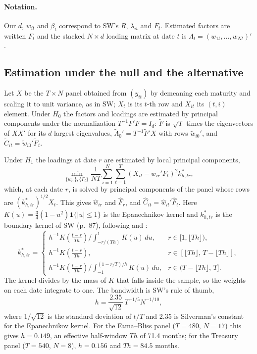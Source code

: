 \documentclass[11pt]{article}
\begin{document}
\paragraph{Notation.} Our $d$, $w_{it}$ and $\beta_t$ correspond to SW's $R$, $\lambda_{it}$ and $F_t$. Estimated factors are written $F_t$ and the stacked $N\times d$ loading matrix at date $t$ is $\Lambda_t=(w_{1t},\ldots,w_{Nt})'$.

\subsection{Estimation under the null and the alternative}

Let $X$ be the $T\times N$ panel obtained from $(y_{it})$ by demeaning each maturity and scaling it to unit variance, as in SW; $X_t$ is its $t$-th row and $X_{it}$ its $(t,i)$ element. Under $H_0$ the factors and loadings are estimated by principal components \citep{BaiNg2002,Bai2003} under the normalization $T^{-1}F'F=I_d$: $\tilde F$ is $\sqrt T$ times the eigenvectors of $XX'$ for its $d$ largest eigenvalues, $\tilde\Lambda_0'=T^{-1}\tilde F'X$ with rows $\tilde w_{i0}'$, and $\tilde C_{it}=\tilde w_{i0}'\tilde F_t$.

Under $H_1$ the loadings at date $r$ are estimated by local principal components,
\begin{equation}\label{eq.localpca}
  \min_{\{w_{ir}\},\{F_t\}} \frac{1}{NT}\sum_{i=1}^{N}\sum_{t=1}^{T}\left(X_{it}-w_{ir}'F_t\right)^2 k^*_{h,tr},
\end{equation}
which, at each date $r$, is solved by principal components of the panel whose rows are $(k^*_{h,tr})^{1/2}X_t$. This gives $\hat w_{ir}$ and $\hat F_r$, and $\hat C_{it}=\hat w_{it}'\hat F_t$. Here $K(u)=\tfrac34(1-u^2)\mathbf 1\{|u|\le 1\}$ is the Epanechnikov kernel and $k^*_{h,tr}$ is the boundary kernel of SW (p.~87), following \citet{HongLi2005} and \citet{LiRacine2007}:
\begin{equation}\label{eq.boundary}
  k^*_{h,tr}=
  \begin{cases}
    h^{-1}K\!\left(\frac{t-r}{Th}\right)\Big/\int_{-r/(Th)}^{1}K(u)\,du, & r\in[1,\lfloor Th\rfloor),\\[4pt]
    h^{-1}K\!\left(\frac{t-r}{Th}\right), & r\in[\lfloor Th\rfloor,\,T-\lfloor Th\rfloor],\\[4pt]
    h^{-1}K\!\left(\frac{t-r}{Th}\right)\Big/\int_{-1}^{(1-r/T)/h}K(u)\,du, & r\in(T-\lfloor Th\rfloor,\,T].
  \end{cases}
\end{equation}
The kernel divides by the mass of $K$ that falls inside the sample, so the weights on each date integrate to one. The bandwidth is SW's rule of thumb,
\begin{equation}\label{eq.bandwidth}
  h=\frac{2.35}{\sqrt{12}}\,T^{-1/5}N^{-1/10},
\end{equation}
where $1/\sqrt{12}$ is the standard deviation of $t/T$ and 2.35 is Silverman's constant for the Epanechnikov kernel. For the Fama--Bliss panel ($T=480$, $N=17$) this gives $h=0.149$, an effective half-window $Th$ of 71.4 months; for the Treasury panel ($T=540$, $N=8$), $h=0.156$ and $Th=84.5$ months.
\end{document}
